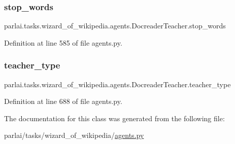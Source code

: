 \subsubsection{\texorpdfstring{stop\+\_\+words}{stop\_words}}
{\footnotesize\ttfamily parlai.\+tasks.\+wizard\+\_\+of\+\_\+wikipedia.\+agents.\+Docreader\+Teacher.\+stop\+\_\+words}



Definition at line 585 of file agents.\+py.

\mbox{\label{classparlai_1_1tasks_1_1wizard__of__wikipedia_1_1agents_1_1DocreaderTeacher_a4582a196ca5c413be227f84c48afb4b5}} 
\subsubsection{\texorpdfstring{teacher\+\_\+type}{teacher\_type}}
{\footnotesize\ttfamily parlai.\+tasks.\+wizard\+\_\+of\+\_\+wikipedia.\+agents.\+Docreader\+Teacher.\+teacher\+\_\+type}



Definition at line 688 of file agents.\+py.



The documentation for this class was generated from the following file\+:\begin{DoxyCompactItemize}
\item 
parlai/tasks/wizard\+\_\+of\+\_\+wikipedia/\hyperlink{parlai_2tasks_2wizard__of__wikipedia_2agents_8py}{agents.\+py}\end{DoxyCompactItemize}
